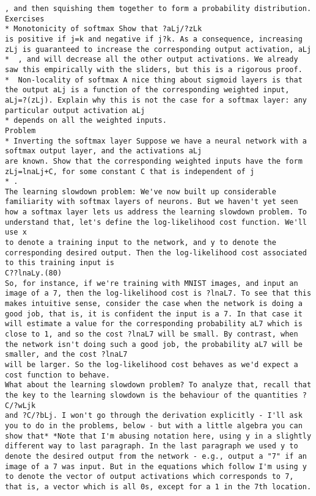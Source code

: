 \begin{lstlisting}
, and then squishing them together to form a probability distribution.
Exercises
* Monotonicity of softmax Show that ?aLj/?zLk
is positive if j=k and negative if j?k. As a consequence, increasing zLj is guaranteed to increase the corresponding output activation, aLj
*  , and will decrease all the other output activations. We already saw this empirically with the sliders, but this is a rigorous proof.
*  Non-locality of softmax A nice thing about sigmoid layers is that the output aLj is a function of the corresponding weighted input, aLj=?(zLj). Explain why this is not the case for a softmax layer: any particular output activation aLj
* depends on all the weighted inputs. 
Problem
* Inverting the softmax layer Suppose we have a neural network with a softmax output layer, and the activations aLj
are known. Show that the corresponding weighted inputs have the form zLj=lnaLj+C, for some constant C that is independent of j
* . 
The learning slowdown problem: We've now built up considerable familiarity with softmax layers of neurons. But we haven't yet seen how a softmax layer lets us address the learning slowdown problem. To understand that, let's define the log-likelihood cost function. We'll use x
to denote a training input to the network, and y to denote the corresponding desired output. Then the log-likelihood cost associated to this training input is 
C??lnaLy.(80)
So, for instance, if we're training with MNIST images, and input an image of a 7, then the log-likelihood cost is ?lnaL7. To see that this makes intuitive sense, consider the case when the network is doing a good job, that is, it is confident the input is a 7. In that case it will estimate a value for the corresponding probability aL7 which is close to 1, and so the cost ?lnaL7 will be small. By contrast, when the network isn't doing such a good job, the probability aL7 will be smaller, and the cost ?lnaL7
will be larger. So the log-likelihood cost behaves as we'd expect a cost function to behave.
What about the learning slowdown problem? To analyze that, recall that the key to the learning slowdown is the behaviour of the quantities ?C/?wLjk
and ?C/?bLj. I won't go through the derivation explicitly - I'll ask you to do in the problems, below - but with a little algebra you can show that* *Note that I'm abusing notation here, using y in a slightly different way to last paragraph. In the last paragraph we used y to denote the desired output from the network - e.g., output a "7" if an image of a 7 was input. But in the equations which follow I'm using y to denote the vector of output activations which corresponds to 7, that is, a vector which is all 0s, except for a 1 in the 7th location. 

\end{lstlisting}
